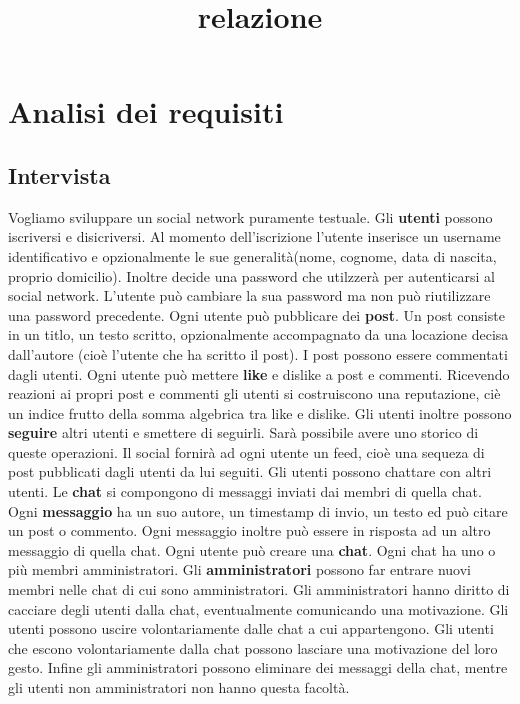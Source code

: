 \documentclass[a4paper,12pt]{report}
\begin{document}
\tableofcontents

\title{relazione}

\chapter{Analisi dei requisiti}
\section{Intervista}
Vogliamo sviluppare un social network puramente testuale.
Gli \textbf{utenti} possono iscriversi e disicriversi. Al momento dell'iscrizione l'utente inserisce un username identificativo e opzionalmente le sue generalità(nome, cognome, data di nascita, proprio domicilio). Inoltre decide una password che utilzzerà per autenticarsi al social network.
L'utente può cambiare la sua password ma non può riutilizzare una password precedente.
Ogni utente può pubblicare dei \textbf{post}. Un post consiste in un titlo, un testo scritto, opzionalmente accompagnato da una locazione decisa dall'autore (cioè l'utente che ha scritto il post). I post possono essere commentati dagli utenti.
Ogni utente può mettere \textbf{like} e dislike a post e commenti. Ricevendo reazioni ai propri post e commenti gli utenti si costruiscono una reputazione, ciè un indice frutto della somma algebrica tra like e dislike.
Gli utenti inoltre possono \textbf{seguire} altri utenti e smettere di seguirli. Sarà possibile avere uno storico di queste operazioni. 
Il social fornirà ad ogni utente un feed, cioè una sequeza di post pubblicati dagli utenti da lui seguiti.
Gli utenti possono chattare con altri utenti. Le \textbf{chat} si compongono di messaggi inviati dai membri di quella chat. Ogni \textbf{messaggio} ha un suo autore, un timestamp di invio, un testo ed può citare un post o commento. Ogni messaggio inoltre può essere in risposta ad un altro messaggio di quella chat. 
Ogni utente può creare una \textbf{chat}. Ogni chat ha uno o più membri amministratori. Gli \textbf{amministratori} possono far entrare nuovi membri nelle chat di cui sono amministratori. Gli amministratori hanno diritto di cacciare degli utenti dalla chat, eventualmente comunicando una motivazione. Gli utenti possono uscire volontariamente dalle chat a cui appartengono. Gli utenti che escono volontariamente dalla chat possono lasciare una motivazione del loro gesto. 
Infine gli amministratori possono eliminare dei messaggi della chat, mentre gli utenti non amministratori non hanno questa facoltà.
\end{document}
